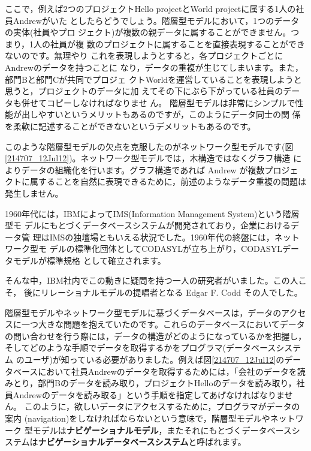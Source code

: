 ここで，例えば2つのプロジェクトHello projectとWorld projectに属する1人の社員Andrewがいた
としたらどうでしょう。階層型モデルにおいて，1つのデータの実体(社員やプロ
ジェクト)が複数の親データに属することができません。つまり，1人の社員が複
数のプロジェクトに属することを直接表現することができないのです。無理やり
これを表現しようとすると，各プロジェクトごとにAndrewのデータを持つことに
なり，データの重複が生じてしまいます。また，部門Bと部門Cが共同でプロジェ
クトWorldを運営していることを表現しようと思うと，プロジェクトのデータに加
えてその下にぶら下がっている社員のデータも併せてコピーしなければなりませ
ん。
階層型モデルは非常にシンプルで性能が出しやすいというメリットもあるのですが，このようにデータ同士の関
係を柔軟に記述することができないというデメリットもあるのです。


このような階層型モデルの欠点を克服したのがネットワーク型モデルです(図
\ref{214707_12Jul12})。ネットワーク型モデルでは，木構造ではなくグラフ構造
によりデータの組織化を行います。グラフ構造であれば Andrew が複数プロジェ
クトに属することを自然に表現できるために，前述のようなデータ重複の問題は
発生しません。


1960年代には，IBMによってIMS(Information Management System)という階層型モ
デルにもとづくデータベースシステムが開発されており，企業におけるデータ管
理はIMSの独壇場ともいえる状況でした。1960年代の終盤には，ネットワーク型モ
デルの標準化団体としてCODASYLが立ち上がり，CODASYLデータモデルが標準規格
として確立されます。


そんな中，IBM社内でこの動きに疑問を持つ一人の研究者がいました。この人こそ，
後にリレーショナルモデルの提唱者となる Edgar F. Codd その人でした。


階層型モデルやネットワーク型モデルに基づくデータベースは，データのアクセ
スに一つ大きな問題を抱えていたのです。これらのデータベースにおいてデータ
の問い合わせを行う際には，データの構造がどのようになっているかを把握し，
そしてどのような手順でデータを取得するかをプログラマ(データベースシステム
のユーザ)が知っている必要がありました。例えば図\ref{214707_12Jul12}のデー
タベースにおいて社員Andrewのデータを取得するためには，「会社のデータを読
みとり，部門Bのデータを読み取り，プロジェクトHelloのデータを読み取り，社
員Andrewのデータを読み取る」という手順を指定してあげなければなりません。
このように，欲しいデータにアクセスするために，プログラマがデータの案内
(navigation)をしなければならないという意味で，階層型モデルやネットワーク
型モデルは{\bf ナビゲーショナルモデル}，またそれにもとづくデータベースシ
ステムは{\bf ナビゲーショナルデータベースシステム}と呼ばれます。


